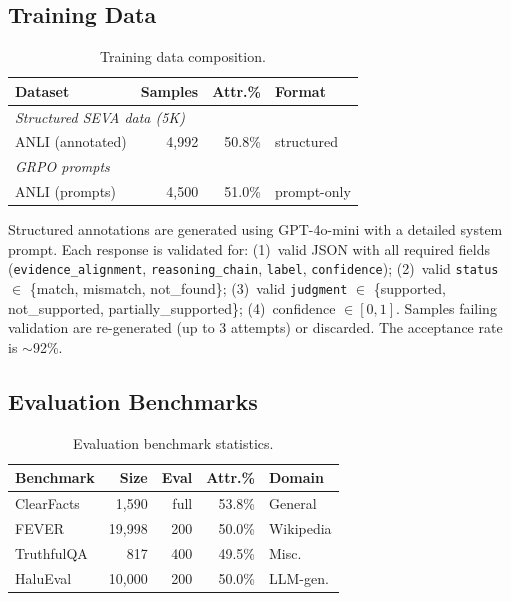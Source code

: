 \documentclass{article}
\begin{document}
\subsection{Training Data}

\begin{table}[h]
\centering
\small
\caption{Training data composition.}
\label{tab:train_data}
\begin{tabular}{lrrl}
\toprule
\textbf{Dataset} & \textbf{Samples} & \textbf{Attr.\%} & \textbf{Format} \\
\midrule
\multicolumn{4}{l}{\textit{Structured SEVA data (5K)}} \\
ANLI (annotated) & 4,992 & 50.8\% & structured \\
\midrule
\multicolumn{4}{l}{\textit{GRPO prompts}} \\
ANLI (prompts) & 4,500 & 51.0\% & prompt-only \\
\bottomrule
\end{tabular}
\end{table}

Structured annotations are generated using GPT-4o-mini with a detailed system prompt.
Each response is validated for:
(1)~valid JSON with all required fields (\texttt{evidence\_alignment}, \texttt{reasoning\_chain}, \texttt{label}, \texttt{confidence});
(2)~valid \texttt{status} $\in$ \{match, mismatch, not\_found\};
(3)~valid \texttt{judgment} $\in$ \{supported, not\_supported, partially\_supported\};
(4)~confidence $\in [0, 1]$.
Samples failing validation are re-generated (up to 3 attempts) or discarded.
The acceptance rate is $\sim$92\%.

\subsection{Evaluation Benchmarks}

\begin{table}[h]
\centering
\small
\caption{Evaluation benchmark statistics.}
\label{tab:eval_data}
\begin{tabular}{lrrrl}
\toprule
\textbf{Benchmark} & \textbf{Size} & \textbf{Eval} & \textbf{Attr.\%} & \textbf{Domain} \\
\midrule
ClearFacts & 1,590 & full & 53.8\% & General \\
FEVER & 19,998 & 200 & 50.0\% & Wikipedia \\
TruthfulQA & 817 & 400 & 49.5\% & Misc. \\
HaluEval & 10,000 & 200 & 50.0\% & LLM-gen. \\
\bottomrule
\end{tabular}
\end{table}
\end{document}
